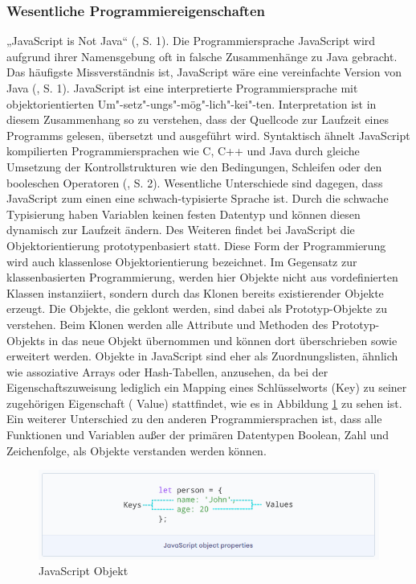 \subsubsection{Wesentliche Programmiereigenschaften}
„JavaScript is Not Java“  (\cite{JS1.091}, S. 1). Die Programmiersprache JavaScript wird aufgrund ihrer Namensgebung oft in falsche Zusammenhänge zu Java gebracht. Das häufigste Missverständnis ist, JavaScript wäre eine vereinfachte Version von Java  (\cite{JS1.091}, S. 1).
\newline
\noindent
JavaScript ist eine interpretierte Programmiersprache mit objektorientierten Um"-setz"-ungs"-mög"-lich"-kei"-ten. Interpretation ist in diesem Zusammenhang so zu verstehen, dass der Quellcode zur Laufzeit eines Programms gelesen, übersetzt und ausgeführt wird.
Syntaktisch ähnelt JavaScript kompilierten Programmiersprachen wie C, C++ und Java durch gleiche Umsetzung der Kontrollstrukturen wie den Bedingungen, Schleifen oder den booleschen Operatoren  (\cite{JS1.091}, S. 2).
Wesentliche Unterschiede sind dagegen, dass JavaScript zum einen eine schwach-typisierte Sprache ist.
Durch die schwache Typisierung haben Variablen keinen festen Datentyp und können diesen dynamisch zur Laufzeit ändern.
Des Weiteren findet bei JavaScript die Objektorientierung prototypenbasiert statt. Diese Form der Programmierung wird auch klassenlose Objektorientierung bezeichnet.
Im Gegensatz zur klassenbasierten Programmierung, werden hier Objekte nicht aus vordefinierten Klassen instanziiert, sondern durch das Klonen bereits existierender Objekte erzeugt.
Die Objekte, die geklont werden, sind dabei als Prototyp-Objekte zu ver\-steh\-en.
Beim Klonen werden alle Attribute und Methoden des Prototyp-Objekts in das neue Objekt übernommen und können dort überschrieben sowie erweitert werden.
Objekte in JavaScript sind eher als Zuordnungslisten, ähnlich wie assoziative Arrays oder Hash-Tabellen, anzusehen, da bei der Eigenschaftszuweisung lediglich ein Mapping eines Schlüsselworts (Key) zu seiner zugehörigen Eigenschaft ( Value) stattfindet, wie es in Abbildung \ref{fig:JavascriptObjekt} zu sehen ist.
\newline
\noindent
Ein weiterer Unterschied zu den anderen Programmiersprachen ist, dass alle Funktionen und Variablen außer der primären Datentypen Boolean, Zahl und Zeichenfolge, als Objekte verstanden werden können.\\

\begin{figure}[tbt]
\centering
\includegraphics[width=\textwidth]{images/JavaScript_Object.PNG}
\caption[JavaScript Objekt]{JavaScript Objekt \cite{JS1.29}}
\label{fig:JavascriptObjekt}
\end{figure}


